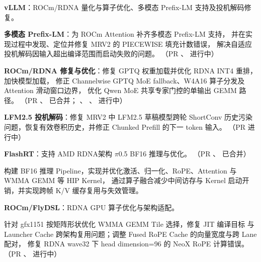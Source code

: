 \documentclass{resume}
\let\ResumeOriginalItemize\itemize
\let\ResumeOriginalEndItemize\enditemize
\renewenvironment{itemize}{%
  \ResumeOriginalItemize
  \addtolength{\topsep}{0.2em}%
  \addtolength{\itemsep}{0.2em}%
}{%
  \ResumeOriginalEndItemize
}
\begin{document}
\begin{itemize}

  \item \textbf{vLLM}：ROCm/RDNA 量化与算子优化、多模态 Prefix-LM 支持及投机解码修复。
  \begin{itemize}
    \item \textbf{多模态 Prefix-LM}：为 ROCm Attention 补齐多模态 Prefix-LM 支持，
    并在实现过程中发现、定位并修复 MRV2 的 PIECEWISE 填充计数错误，
    解决自适应投机解码因输入超出编译范围而启动失败的问题。
    （PR 、
     进行中）

    \item \textbf{ROCm/RDNA 修复与优化}：修复 GPTQ 权重加载并优化 RDNA INT4 重排，加快模型加载，
    修正 Channelwise GPTQ MoE fallback、W4A16 算子分发及 Attention 滑动窗口边界，
    优化 Qwen MoE 共享专家门控的单输出 GEMM 路径。
    （PR 、
     已合并；
    、
    、
     进行中）

    \item \textbf{LFM2.5 投机解码}：修复 MRV2 中 LFM2.5 草稿模型跨轮 ShortConv
    历史污染问题，恢复有效卷积历史，并修正 Chunked Prefill 的下一 token 输入。
    （PR  进行中）
  \end{itemize}

  \item \textbf{FlashRT}：支持 AMD RDNA架构 $\pi$0.5 BF16 推理与优化。
  （PR 、
   已合并）
  \begin{itemize}
    \item 构建 BF16 推理 Pipeline，实现并优化激活、归一化、RoPE、Attention 与 WMMA GEMM 等 HIP Kernel，
    通过算子融合减少中间访存与 Kernel 启动开销，并实现跨帧 K/V 缓存复用与失效管理。
  \end{itemize}

  \item \textbf{ROCm/FlyDSL}：RDNA GPU 算子优化与架构适配。
  \begin{itemize}
    \item 针对 gfx1151 按矩阵形状优化 WMMA GEMM Tile 选择，修复 JIT 编译目标
    与 Launcher Cache 跨架构复用问题；调整 Fused RoPE Cache 的向量宽度与跨 Lane 配对，
    修复 RDNA wave32 下 head dimension=96 的 NeoX RoPE 计算错误。
    （PR 、
     进行中）
  \end{itemize}
\end{itemize}
\end{document}
